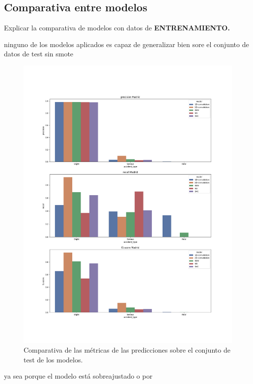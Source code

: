   \subsection{Comparativa entre modelos}

    Explicar la comparativa de modelos con datos de \textbf{ENTRENAMIENTO.}

ninguno de los modelos aplicados es capaz de generalizar bien sore el conjunto de datos de test sin smote
    \begin{figure}[h]
        \centering
        \includegraphics[width=16cm]{archivos/5.Resultados/ComparativaTest}
        \caption{Comparativa de las métricas de las predicciones sobre el conjunto de test de los modelos.}
        \label{ResultsTestImage}
     \end{figure}





ya sea porque el modelo está sobreajustado o por


